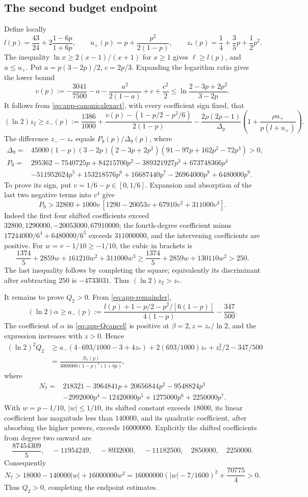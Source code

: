\subsection*{The second budget endpoint}
Define locally
\[
 l(p)=\frac{43}{24}+2\frac{1-6p}{1+6p},\qquad
 u_+(p)=p+\frac{p^2}{2(1-p)},\qquad z_*(p)=\frac14+\frac35p+\frac12p^2.
\]
The inequality $\ln x\ge2(x-1)/(x+1)$ for $x\ge1$ gives $\ell\ge l(p)$, and
$u\le u_+$. Put $a=p(3-2p)/2$, $c=2p/3$. Expanding the logarithm ratio gives
the lower bound
\[
 v(p):=-\frac{3041}{7500}-a-\frac{a^2}{2(1-a)}+c+\frac{c^2}{2}
 \le\ln\frac{2-3p+2p^2}{3-2p}.
\]
It follows from \eqref{eq:app-canonicalexact}, with every coefficient sign fixed, that
\[
 (\ln2)z_2\ge z_-(p):=
 \frac{1386}{1000}+\frac{v(p)-(1-p/2-p^2/6)}{2(1-p)}
 -\frac{2\rho(2\rho-1)}{\Delta_p}
       \left(1+\frac{\rho u_+}{p(l+u_+)}\right).
\]
The difference $z_--z_*$ equals $P_9(p)/\Delta_9(p)$, where
\begin{align*}
 \Delta_9={}&45000(1-p)(3-2p)(2-3p+2p^2)(91-97p+162p^2-72p^3)>0,\\
 P_9={}&295362-7540725p+84215700p^2-389321927p^3+673748366p^4\\
 &-511952624p^5+153218576p^6+16687440p^7-26964000p^8+6480000p^9.
\end{align*}
To prove its sign, put $v=1/6-p\in[0,1/6]$. Expansion and absorption of the
last two negative terms into $v^4$ give
\[
 P_9>32800+1000v\,[1290-20053v+67910v^2+311000v^3].
\]
Indeed the first four shifted coefficients exceed
$32800,1290000,-20053000,67910000$; the fourth-degree coefficient minus
$17244000/6^4+6480000/6^5$ exceeds $311000000$, and the intervening
coefficients are positive. For $w=v-1/10\ge-1/10$, the cubic in brackets is
\[
 \frac{1374}{5}+2859w+161210w^2+311000w^3
 \ge\frac{1374}{5}+2859w+130110w^2>250.
\]
The last inequality follows by completing the square; equivalently its
discriminant after subtracting $250$ is $-4733031$. Thus $(\ln2)z_2>z_*$.

It remains to prove $Q_2>0$. From \eqref{eq:app-remainder},
\[
 (\ln2)\alpha\ge a_-(p):=
 \frac{l(p)+1-p/2-p^2/[6(1-p)]}{4(1-p)}-\frac{347}{500}.
\]
The coefficient of $\alpha$ in \eqref{eq:app-Qcancel} is positive at
$\beta=2,z=z_*/\ln2$, and the expression increases with $z>0$. Hence
\begin{align*}
 (\ln2)^2Q_2
 &\ge a_-(4\cdot693/1000-3+4z_*)
       +2(693/1000)z_*+z_*^2/2-347/500\\
 &=\frac{N_7(p)}{3000000(1-p)^2(1+6p)},
\end{align*}
where
\begin{align*}
 N_7={}&218321-3964841p+20656844p^2-9548824p^3\\
 &-2992000p^4-12420000p^5+1275000p^6+2250000p^7.
\end{align*}
With $w=p-1/10$, $|w|\le1/10$, its shifted constant exceeds $18000$, its
linear coefficient has magnitude less than $140000$, and its quadratic
coefficient, after absorbing the higher powers, exceeds $16000000$. Explicitly
the shifted coefficients from degree two onward are
\[
 \frac{87454309}{5},\quad-11954249,\quad-8932000,\quad-11182500,
 \quad2850000,\quad2250000.
\]
Consequently
\[
 N_7>18000-140000|w|+16000000w^2
 =16000000(|w|-7/1600)^2+\frac{70775}{4}>0.
\]
Thus $Q_2>0$, completing the endpoint estimates.
